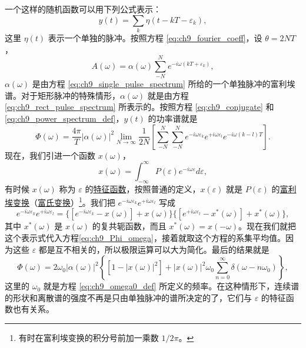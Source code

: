 一个这样的随机函数可以用下列公式表示：
\begin{equation}
y(t) = \sum_k \eta(t - kT - \varepsilon_k),
\end{equation}
这里 $ \eta(t) $ 表示一个单独的脉冲。按照方程 \eqref{eq:ch9_fourier_coeff}，设 $ \theta = 2NT $，
\begin{equation*}
A(\omega) = \alpha(\omega) \sum_{-N}^{N} e^{-i\omega(kT+\varepsilon_k)},
\end{equation*}
$ \alpha(\omega) $ 是由方程 \eqref{eq:ch9_single_pulse_spectrum} 所给的一个单独脉冲的富利埃谱。对于矩形脉冲的特殊情形，$ \alpha(\omega) $ 就是由方程 \eqref{eq:ch9_rect_pulse_spectrum} 所表示的。按照方程 \eqref{eq:ch9_conjugate} 和 \eqref{eq:ch9_power_spectrum_def}，$ y(t) $ 的功率谱就是
\begin{equation}\label{eq:ch9_Phi_omega}
\Phi(\omega) = \frac{4\pi}{T} |\alpha(\omega)|^2 \lim_{N \to \infty} \frac{1}{2N} \left[ \sum_{-N}^{N} \sum_{-N}^{N} e^{-i\omega\varepsilon_k} e^{+i\omega\varepsilon_l} e^{-i\omega(k-l)T} \right].
\end{equation}
现在，我们引进一个函数 $ x(\omega) $，
\begin{equation}
x(\omega) = \int_{-\infty}^{\infty} P(\varepsilon) e^{-i\omega\varepsilon} d\varepsilon,
\end{equation}
有时候 $ x(\omega) $ 称为 $ \varepsilon $ 的\underline{特征函数}，按照普通的定义，$ x(\varepsilon) $ 就是 $ P(\varepsilon) $ 的\underline{富利埃变换}（\underline{富氏变换}）\footnote{有时在富利埃变换的积分号前加一乘数 $ 1/2\pi $。}。我们把 $ e^{-i\omega\varepsilon_k} e^{+i\omega\varepsilon_l} $ 写成
\begin{equation*}
e^{-i\omega\varepsilon_k} e^{+i\omega\varepsilon_l} = \{ [e^{-i\omega\varepsilon_k} - x(\omega)] + x(\omega) \} \{ [e^{+i\omega\varepsilon_l} - x^*(\omega)] + x^*(\omega) \},
\end{equation*}
其中 $ x^*(\omega) $ 是 $ x(\omega) $ 的复共轭函数，而且 $ x^*(\omega) = x(-\omega) $。现在我们就把这个表示式代入方程\eqref{eq:ch9_Phi_omega}，接着就取这个方程的系集平均值。因为这些 $\varepsilon$ 都是互不相关的，所以极限运算可以大为简化。最后的结果就是
\begin{equation}\label{eq:ch9_pulse_jitter_spectrum}
\Phi(\omega) = 2\omega_0 |\alpha(\omega)|^2 \left\{ [1 - |x(\omega)|^2] + |x(\omega)|^2 \omega_0 \sum_{n=0}^\infty \delta(\omega - n\omega_0) \right\},
\end{equation}
这里的 $\omega_0$ 就是方程 \eqref{eq:ch9_omega0_def} 所定义的频率。在这种情形下，连续谱的形状和离散谱的强度不再是只由单独脉冲的谱所决定的了，它们与 $\varepsilon$ 的特征函数也有关系。

